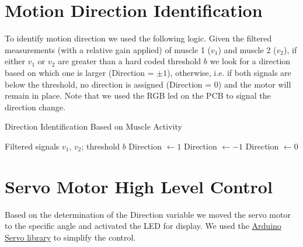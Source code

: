 \documentclass[10pt]{article}
\begin{document}
\section{Motion Direction Identification}
To identify motion direction we used the following logic. Given the filtered measurements (with a relative gain applied) of muscle 1 ($v_1$) and muscle 2 ($v_2$), if either $v_1$ or $v_2$ are greater than a hard coded threshold $b$ we look for a direction based on which one is larger (Direction = $\pm1$), otherwise, i.e. if both signals are below the threshold, no direction is assigned (Direction = $0$) and the motor will remain in place. Note that we used the RGB led on the PCB to signal the direction change.
\begin{algorithm}
\caption{Direction Identification Based on Muscle Activity}
\begin{algorithmic}[1]
\REQUIRE Filtered signals $v_1$, $v_2$; threshold $b$
        \STATE Direction $\gets 1$
    \ELSE
        \STATE Direction $\gets -1$
    \ENDIF
\ELSE
    \STATE Direction $\gets 0$
\ENDIF
\end{algorithmic}
\end{algorithm}

\section{Servo Motor High Level Control}
Based on the determination of the Direction variable we moved the servo motor to the specific angle and activated the LED for display. 
We used the \href{https://docs.arduino.cc/libraries/servo/}{Arduino Servo library} to simplify the control.  
\end{document}
